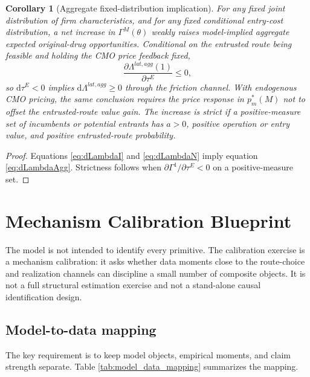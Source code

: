 \documentclass[12pt]{article}
\newtheorem{corollary}{Corollary}
\newcommand{\1}{\mathbf{1}}
\newcommand{\dd}{\mathrm{d}}
\begin{document}
\begin{corollary}[Aggregate fixed-distribution implication]
For any fixed joint distribution of firm characteristics, and for any fixed conditional entry-cost distribution, a net increase in $\Gamma^M(\theta)$ weakly raises model-implied aggregate expected original-drug opportunities. Conditional on the entrusted route being feasible and holding the CMO price feedback fixed,
\begin{equation}
    \frac{\partial \Lambda^{lat,agg}(1)}{\partial\tau^E}\le0,
    \label{eq:agg_prop_derivative}
\end{equation}
so $\dd\tau^E<0$ implies $\dd\Lambda^{lat,agg}\ge0$ through the friction channel. With endogenous CMO pricing, the same conclusion requires the price response in $p_m^*(M)$ not to offset the entrusted-route value gain. The increase is strict if a positive-measure set of incumbents or potential entrants has $a>0$, positive operation or entry value, and positive entrusted-route probability.
\end{corollary}

\begin{proof}
Equations \eqref{eq:dLambdaI} and \eqref{eq:dLambdaN} imply equation \eqref{eq:dLambdaAgg}. Strictness follows when $\partial\Gamma^1/\partial\tau^E<0$ on a positive-measure set.
\end{proof}

\section{Mechanism Calibration Blueprint}

The model is not intended to identify every primitive. The calibration exercise is a mechanism calibration: it asks whether data moments close to the route-choice and realization channels can discipline a small number of composite objects. It is not a full structural estimation exercise and not a stand-alone causal identification design.

\subsection{Model-to-data mapping}

The key requirement is to keep model objects, empirical moments, and claim strength separate. Table \ref{tab:model_data_mapping} summarizes the mapping.
\end{document}
